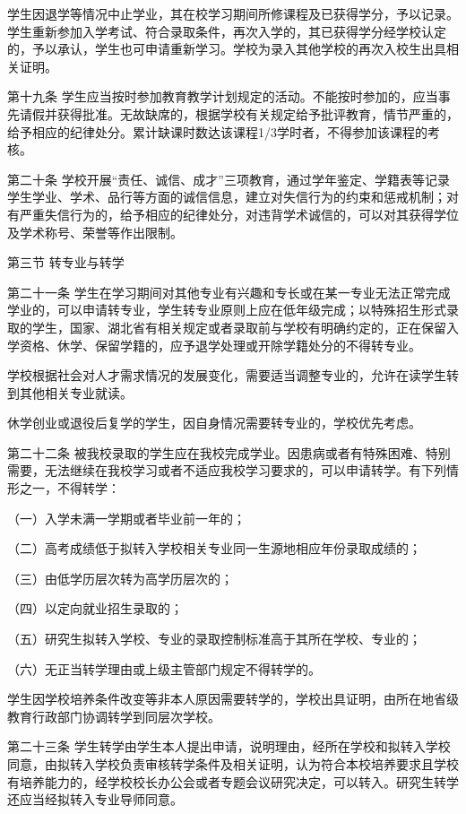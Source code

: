 \documentclass[UTF8,12pt,a4paper]{report}
\begin{document}
学生因退学等情况中止学业，其在校学习期间所修课程及已获得学分，予以记录。学生重新参加入学考试、符合录取条件，再次入学的，其已获得学分经学校认定的，予以承认，学生也可申请重新学习。学校为录入其他学校的再次入校生出具相关证明。

第十九条 学生应当按时参加教育教学计划规定的活动。不能按时参加的，应当事先请假并获得批准。无故缺席的，根据学校有关规定给予批评教育，情节严重的，给予相应的纪律处分。累计缺课时数达该课程1/3学时者，不得参加该课程的考核。

第二十条 学校开展“责任、诚信、成才”三项教育，通过学年鉴定、学籍表等记录学生学业、学术、品行等方面的诚信信息，建立对失信行为的约束和惩戒机制；对有严重失信行为的，给予相应的纪律处分，对违背学术诚信的，可以对其获得学位及学术称号、荣誉等作出限制。

第三节 转专业与转学

第二十一条 学生在学习期间对其他专业有兴趣和专长或在某一专业无法正常完成学业的，可以申请转专业，学生转专业原则上应在低年级完成；以特殊招生形式录取的学生，国家、湖北省有相关规定或者录取前与学校有明确约定的，正在保留入学资格、休学、保留学籍的，应予退学处理或开除学籍处分的不得转专业。

学校根据社会对人才需求情况的发展变化，需要适当调整专业的，允许在读学生转到其他相关专业就读。

休学创业或退役后复学的学生，因自身情况需要转专业的，学校优先考虑。

第二十二条 被我校录取的学生应在我校完成学业。因患病或者有特殊困难、特别需要，无法继续在我校学习或者不适应我校学习要求的，可以申请转学。有下列情形之一，不得转学：

（一）入学未满一学期或者毕业前一年的；

（二）高考成绩低于拟转入学校相关专业同一生源地相应年份录取成绩的；

（三）由低学历层次转为高学历层次的；

（四）以定向就业招生录取的；

（五）研究生拟转入学校、专业的录取控制标准高于其所在学校、专业的；

（六）无正当转学理由或上级主管部门规定不得转学的。

学生因学校培养条件改变等非本人原因需要转学的，学校出具证明，由所在地省级教育行政部门协调转学到同层次学校。

第二十三条 学生转学由学生本人提出申请，说明理由，经所在学校和拟转入学校同意，由拟转入学校负责审核转学条件及相关证明，认为符合本校培养要求且学校有培养能力的，经学校校长办公会或者专题会议研究决定，可以转入。研究生转学还应当经拟转入专业导师同意。
\end{document}
